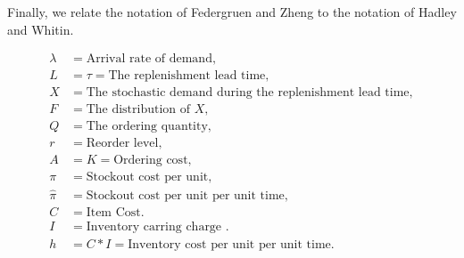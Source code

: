\documentclass{article}
\newcommand{\1}[1]{\mathbb{1}_{#1}}
\begin{document}
Finally, we relate the notation of Federgruen and Zheng to the
notation of Hadley and Whitin.

   \begin{align*}
     \lambda &= \text{Arrival rate of demand}, \\
     L &= \tau = \text{The replenishment lead time}, \\
     X &= \text{The stochastic demand during the replenishment lead time}, \\
     F &= \text{The distribution of } X,\\
     Q &= \text{The ordering quantity}, \\
     r &= \text{Reorder level}, \\
     A & = K = \text{Ordering cost},\\
     \pi & = \text{Stockout cost per unit},\\
     \hat \pi & = \text{Stockout cost per unit per unit time},\\
     C &= \text{Item Cost}. \\
     I &= \text{Inventory carring charge }. \\
     h &= C*I = \text{Inventory cost per unit per unit time}. \\
   \end{align*}
\end{document}
